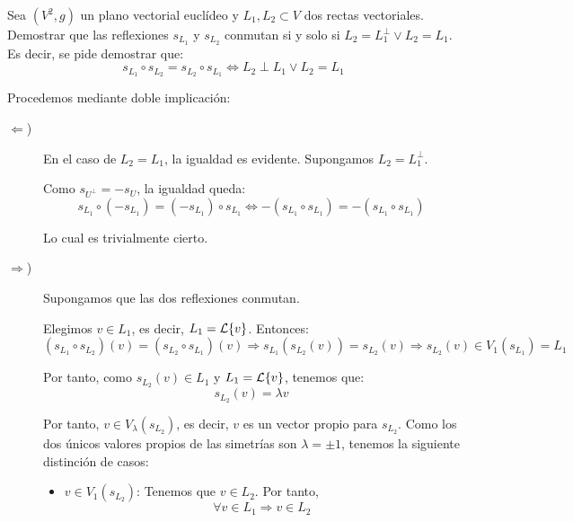 \begin{ejercicio}\label{Ej3}
    Sea $(V^2, g)$ un plano vectorial euclídeo y $L_1,L_2\subset V$ dos rectas vectoriales. Demostrar que las reflexiones $s_{L_1}$ y $s_{L_2}$ conmutan si y solo si $L_2=L_1^\perp \lor L_2=L_1$.\\

    Es decir, se pide demostrar que:
    \begin{equation*}
        s_{L_1}\circ s_{L_2} = s_{L_2}\circ s_{L_1} \Longleftrightarrow L_2\perp L_1 \lor L_2=L_1
    \end{equation*}

    Procedemos mediante doble implicación:
    \begin{description}
        \item [$\Longleftarrow$)] En el caso de $L_2=L_1$, la igualdad es evidente. Supongamos $L_2=L_1^\perp$.

        Como $s_{U^\perp}=-s_U$, la igualdad queda:
        \begin{equation*}
            s_{L_1}\circ (-s_{L_1}) = (-s_{L_1})\circ s_{L_1} \Longleftrightarrow -(s_{L_1}\circ s_{L_1}) = -(s_{L_1}\circ s_{L_1})
        \end{equation*}

        Lo cual es trivialmente cierto.


        \item [$\Longrightarrow$)] Supongamos que las dos reflexiones conmutan.

        Elegimos $v\in L_1$, es decir, $L_1=\mathcal{L}\{v\}$. Entonces:
        \begin{equation*}
            (s_{L_1}\circ s_{L_2})(v) = 
            (s_{L_2}\circ s_{L_1})(v) \Longrightarrow s_{L_1}(s_{L_2}(v)) = s_{L_2}(v) \Longrightarrow s_{L_2}(v)\in V_1(s_{L_1})=L_1
        \end{equation*}

        Por tanto, como $s_{L_2}(v)\in L_1$ y $L_1=\mathcal{L}\{v\}$, tenemos que:
        \begin{equation*}
            s_{L_2}(v) = \lambda v
        \end{equation*}

        Por tanto, $v\in V_\lambda (s_{L_2})$, es decir, $v$ es un vector propio para $s_{L_2}$. Como los dos únicos valores propios de las simetrías son $\lambda = \pm 1$, tenemos la siguiente distinción de casos:
        \begin{itemize}
            \item \underline{$v\in V_1(s_{L_2})$}: Tenemos que $v\in L_2$. Por tanto,
            \begin{equation*}
                \forall v\in L_1 \Longrightarrow v\in L_2
            \end{equation*}


\end{itemize}
\end{description}
\end{ejercicio}
